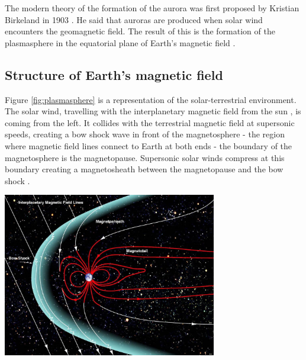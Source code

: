 \documentclass[12pt]{article}
\newenvironment{Figure}
  {\par\medskip\noindent\minipage{\linewidth}}
  {\endminipage\par\medskip}
\begin{document}
The modern theory of the formation of the aurora was first proposed by Kristian Birkeland in 1903 \cite{birkeland2018norwegian}. He said that auroras are produced when solar wind encounters the geomagnetic field. The result of this is the formation of the plasmasphere in the equatorial plane of Earth's magnetic field \cite{cosmicelectrodyn}.

\subsection{Structure of Earth's magnetic field}
Figure \ref{fig:plasmasphere} is a representation of the solar-terrestrial environment. The solar wind, travelling with the interplanetary magnetic field from the sun \cite{Svalgaard_2010}, is coming from the left. It collides with the terrestrial magnetic field at supersonic speeds, creating a bow shock wave in front of the magnetosphere - the region where magnetic field lines connect to Earth at both ends - the boundary of the magnetosphere is the magnetopause. Supersonic solar winds compress at this boundary creating a magnetosheath between the magnetopause and the bow shock \cite{BSPP}.

\begin{Figure}
    \begin{minipage}[c]{0.57\textwidth}
        \centering
        \includegraphics[width=0.7\textwidth]{NASA-Magnetosphere.jpeg}
    \end{minipage}\hfill
    \begin{minipage}[c]{0.4\textwidth}
        \label{fig:plasmasphere}
    \end{minipage}
\end{Figure}
\end{document}
